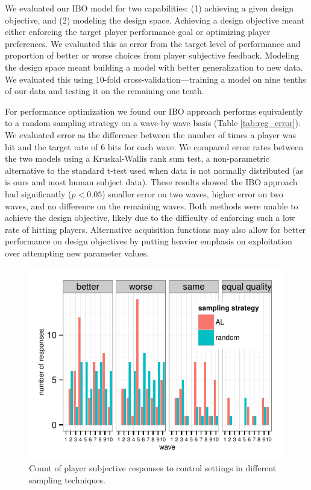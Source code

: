 \documentclass{sig-alternate}
\begin{document}

We evaluated our IBO model for two capabilities: (1) achieving a given design objective, and (2) modeling the design space. Achieving a design objective meant either enforcing the target player performance goal or optimizing player preferences. We evaluated this as error from the target level of performance and proportion of better or worse choices from player subjective feedback. Modeling the design space meant building a model with better generalization to new data. We evaluated this using 10-fold cross-validation---training a model on nine tenths of our data and testing it on the remaining one tenth.

For performance optimization we found our IBO approach performs equivalently to a random sampling strategy on a wave-by-wave basis (Table \ref{tab:reg_error}). We evaluated error as the difference between the number of times a player was hit and the target rate of 6 hits for each wave. We compared error rates between the two models using a Kruskal-Wallis rank sum test, a non-parametric alternative to the standard t-test used when data is not normally distributed (as is ours and most human subject data). These results showed the IBO approach had significantly ($p<0.05$) smaller error on two waves, higher error on two waves, and no difference on the remaining waves. Both methods were unable to achieve the design objective, likely due to the difficulty of enforcing such a low rate of hitting players. Alternative acquisition functions may also allow for better performance on design objectives by putting heavier emphasis on exploitation over attempting new parameter values.


\begin{figure}[tbph]
\centering
\includegraphics[width=\linewidth]{pref_choice}
\caption{Count of player subjective responses to control settings in different sampling techniques.}
\label{fig:pref_choice}
\end{figure}
\end{document}
